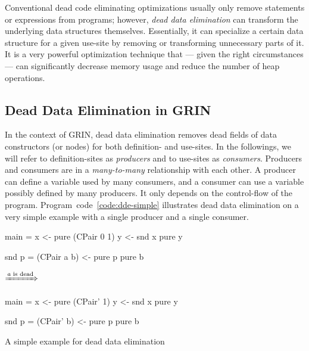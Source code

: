 \documentclass[main.tex]{subfiles}
\begin{document}
	
	
	Conventional dead code eliminating optimizations usually only remove statements or expressions from programs; however, \emph{dead data elimination} can transform the underlying data structures themselves. Essentially, it can specialize a certain data structure for a given use-site by removing or transforming unnecessary parts of it. It is a very powerful optimization technique that --- given the right circumstances --- can significantly decrease memory usage and reduce the number of heap operations.
	
	\subsection{Dead Data Elimination in GRIN}
	
	In the context of GRIN, dead data elimination removes dead fields of data constructors (or nodes) for both definition- and use-sites. In the followings, we will refer to definition-sites as \emph{producers} and to use-sites as \emph{consumers}. Producers and consumers are in a \emph{many-to-many} relationship with each other. A producer can define a variable used by many consumers, and a consumer can use a variable possibly defined by many producers. It only depends on the control-flow of the program. Program~code~\ref{code:dde-simple} illustrates dead data elimination on a very simple example with a single producer and a single consumer.
	
	\begin{codeFloat}[h]
		\begin{center}
			\begin{minipage}{0.35\textwidth}
				\begin{haskell}
					main = 
					  x <- pure (CPair 0 1)
					  y <- snd x
					  pure y 
					
					snd p =
					  (CPair a b) <- pure p
					  pure b
				\end{haskell}
			\end{minipage}
			$\xRightarrow{\text{\emph{a} is dead}}$
			\begin{minipage}{0.35\textwidth}
				\begin{haskell}
					main = 
					  x <- pure (CPair' 1)
					  y <- snd x
					  pure y 
					
					snd p =
					  (CPair' b) <- pure p
					  pure b
				\end{haskell}
			\end{minipage}
		\end{center}
		\caption{A simple example for dead data elimination}
		\label{code:dde-simple}
	\end{codeFloat}
\end{document}
